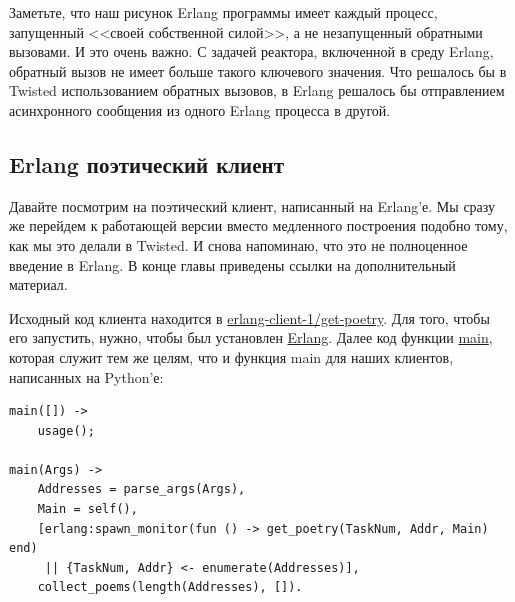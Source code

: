 Заметьте, что наш рисунок Erlang программы имеет 
каждый процесс, запущенный <<своей собственной силой>>, а не 
незапущенный обратными вызовами. И это очень важно. 
С задачей реактора, включенной в среду Erlang, 
обратный вызов не имеет больше такого ключевого значения. 
Что решалось бы в Twisted использованием обратных вызовов, 
в Erlang решалось бы отправлением асинхронного сообщения из 
одного Erlang процесса в другой.


\subsection{Erlang поэтический клиент}

Давайте посмотрим на поэтический клиент, написанный 
на Erlang'е. Мы сразу же перейдем к работающей версии 
вместо медленного построения подобно тому, как мы это делали в Twisted. 
И снова напоминаю, что это не полноценное введение в Erlang. 
В конце главы приведены ссылки на дополнительный материал.


Исходный код клиента находится в  
\href{http://github.com/jdavisp3/twisted-intro/blob/master/erlang-client-1/get-poetry#L1}{erlang-client-1/get-poetry}. 
Для того, чтобы его запустить, нужно, чтобы был 
установлен \href{http://erlang.org/}{Erlang}. Далее 
код функции 
\href{http://github.com/jdavisp3/twisted-intro/blob/master/erlang-client-1/get-poetry#L96}{main}, 
которая служит тем же целям, что и функция main для 
наших клиентов, написанных на Python'е:

\begin{scriptsize}\begin{verbatim}
main([]) ->
    usage();

main(Args) ->
    Addresses = parse_args(Args),
    Main = self(),
    [erlang:spawn_monitor(fun () -> get_poetry(TaskNum, Addr, Main) end)
     || {TaskNum, Addr} <- enumerate(Addresses)],
    collect_poems(length(Addresses), []).

\end{verbatim}\end{scriptsize}

